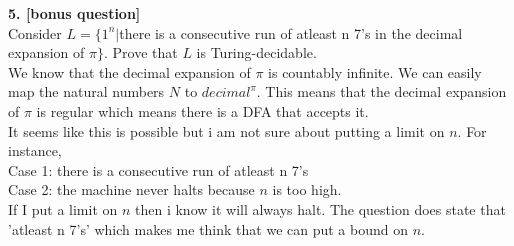 \documentclass[a4paper,12pt]{article}
\begin{document}
\newpage
\textbf{5. [bonus question]} \\
Consider $L = \{ 1^{n} |$there is a consecutive run of atleast n 7's in the decimal expansion of $\pi\}$. Prove that $L$ is Turing-decidable. \\
We know that the decimal expansion of $\pi$ is countably infinite. We can easily map the natural numbers $N$ to $decimal^{\pi}$. This means that the decimal expansion of $\pi$ is regular which means there is a DFA that accepts it. \\
It seems like this is possible but i am not sure about putting a limit on $n$. For instance,\\ Case 1: there is a consecutive run of atleast n 7's \\Case 2: the machine never halts because $n$ is too high. \\
If I put a limit on $n$ then i know it will always halt. The question does state that 'atleast n 7's' which makes me think that we can put a bound on $n$.
\end{document}
